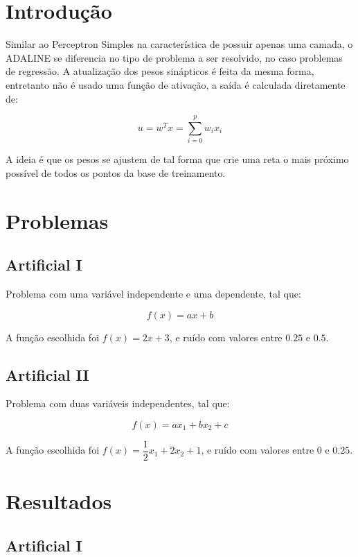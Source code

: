 \renewcommand{\figurename}{Figura}

\section{Introdução}

Similar ao Perceptron Simples na característica de possuir apenas uma
camada, o ADALINE se diferencia no tipo de problema a ser resolvido, no
caso problemas de regressão. A atualização dos pesos sinápticos é feita
da mesma forma, entretanto não é usado uma função de ativação, a saída é
calculada diretamente de:

\[
u = w^T x = \sum^p_{i = 0} w_i x_i
\]

A ideia é que os pesos se ajustem de tal forma que crie uma reta o mais
próximo possível de todos os pontos da base de treinamento.

\section{Problemas}

\subsection{Artificial I}

Problema com uma variável independente e uma dependente, tal que:

\[f(x) = ax + b\]

A função escolhida foi \(f(x) = 2x + 3\), e ruído com valores entre
\(0.25\) e \(0.5\).

\subsection{Artificial II}

Problema com duas variáveis independentes, tal que:

\[
f(x) = ax_1 + bx_2 + c
\]

A função escolhida foi \(f(x) = \dfrac{1}{2}x_1 + 2x_2 + 1\), e ruído
com valores entre \(0\) e \(0.25\).

\section{Resultados}

\subsection{Artificial I}

